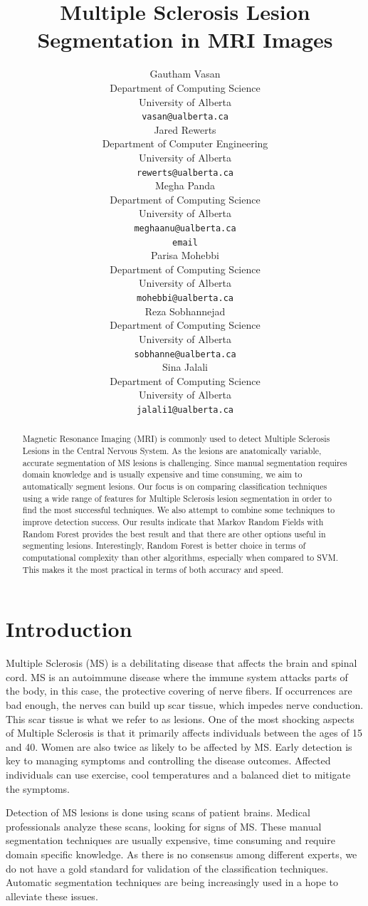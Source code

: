 \documentclass{article} %
\title{Multiple Sclerosis Lesion Segmentation in MRI Images }
\author{
Gautham Vasan \\
Department of Computing Science\\
University of Alberta\\
\texttt{vasan@ualberta.ca} \\
\And
Jared Rewerts \\
Department of Computer Engineering \\
University of Alberta \\
\texttt{rewerts@ualberta.ca} \\
\And
Megha Panda \\
Department of Computing Science\\
University of Alberta \\
\texttt{meghaanu@ualberta.ca} \\
\texttt{email} \\
\And
Parisa Mohebbi \\
Department of Computing Science \\
University of Alberta \\
\texttt{mohebbi@ualberta.ca} \\
\And
Reza Sobhannejad \\
Department of Computing Science \\
University of Alberta \\
\texttt{sobhanne@ualberta.ca} \\
\And
Sina Jalali  \\
Department of Computing Science \\
University of Alberta \\
\texttt{jalali1@ualberta.ca} \\
}
\begin{document}
\maketitle
\begin{abstract}
Magnetic Resonance Imaging (MRI) is commonly used to detect Multiple Sclerosis Lesions in the Central Nervous System. As the lesions are anatomically  variable, accurate segmentation of MS lesions is challenging. Since manual segmentation requires domain knowledge and is usually expensive and time consuming, we aim to automatically segment lesions. Our focus is on comparing classification techniques using a wide range of features for Multiple Sclerosis lesion segmentation in order to find the most successful techniques. We also attempt to combine some techniques to improve detection success. Our results indicate that Markov Random Fields with Random Forest provides the best result and that there are other options useful in segmenting lesions. Interestingly, Random Forest is better choice in terms of computational complexity than other algorithms, especially when compared to SVM. This makes it the most practical in terms of both accuracy and speed. 
\end{abstract}

\section{Introduction}
Multiple Sclerosis (MS) is a debilitating disease that affects the brain and spinal cord.  MS is an autoimmune disease where the immune system attacks parts of the body, in this case, the protective covering of nerve fibers. If occurrences are bad enough, the nerves can build up scar tissue, which impedes nerve conduction. This scar tissue is what we refer to as lesions. One of the most shocking aspects of Multiple Sclerosis is that it primarily affects individuals between the ages of 15 and 40. Women are also twice as likely to be affected by MS. Early detection is key to managing symptoms and controlling the disease outcomes. Affected individuals can use exercise, cool temperatures and a balanced diet to mitigate the symptoms.

Detection of MS lesions is done using scans of patient brains. Medical professionals analyze these scans, looking for signs of MS. These manual segmentation techniques are usually expensive, time consuming and require domain specific knowledge. As there is no consensus among different experts, we do not have a gold standard for validation of the classification techniques. Automatic segmentation techniques are being increasingly used in a hope to alleviate these issues. 
\end{document}
